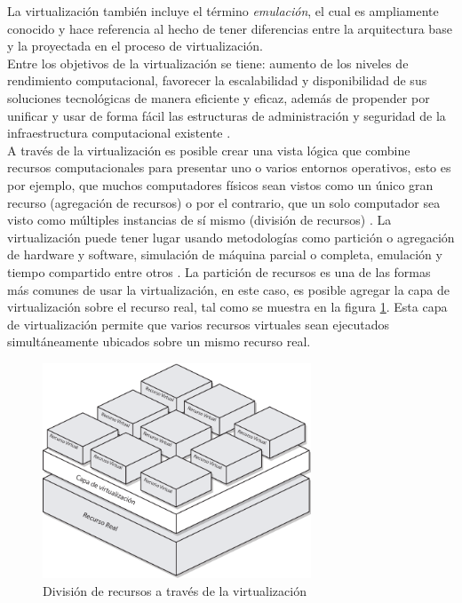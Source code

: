 La virtualización también incluye el término \textit{emulación}, el cual es ampliamente conocido y hace referencia al hecho de tener diferencias entre la arquitectura base y la proyectada en el proceso de virtualización.\\

Entre los objetivos de la virtualización se tiene: aumento de los niveles de rendimiento computacional, favorecer la escalabilidad y disponibilidad de sus soluciones tecnológicas de manera eficiente y eficaz, además de propender por unificar y usar de forma fácil las estructuras de administración y seguridad de la infraestructura computacional existente \parencite{Kusnetzky2011, Hui2014}. \\

A través de la virtualización es posible crear una vista lógica  que combine recursos computacionales para presentar uno o varios entornos operativos, esto es por ejemplo, que muchos computadores físicos sean vistos como un único gran recurso (agregación de recursos) o por el contrario, que un solo computador sea visto como múltiples instancias de sí mismo (división de recursos)  \parencite{Silberschatz2014}. La virtualización puede tener lugar usando metodologías como partición o agregación de hardware y software, simulación de máquina parcial o completa, emulación y tiempo compartido entre otros \parencite{Chiueh2005, Hoopes2009}. La partición de recursos es una de las formas más comunes de usar la virtualización, en este caso, es posible agregar la capa de virtualización sobre el recurso real, tal como se muestra en la figura \ref{fig:divisionDeRecursosConVirtualizacion}. Esta capa de virtualización permite que varios recursos virtuales sean ejecutados simultáneamente ubicados sobre un mismo recurso real.

\begin{figure}[!hbtp]
	\centering
	\includegraphics[width=8cm]{Pictures/divisionRecursosFisicosConV12N.pdf}
	\vspace{-0.2cm}
	\caption{División de recursos a través de la virtualización}
	\label{fig:divisionDeRecursosConVirtualizacion}
\end{figure}


